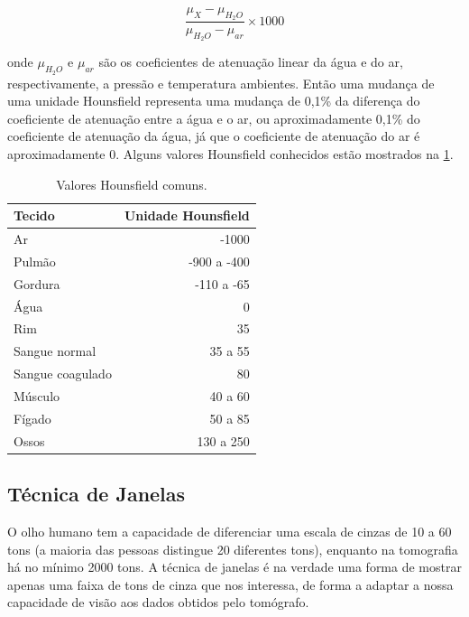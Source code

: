\begin{equation}
	\frac{\mu_X-\mu_{H_2O}}{\mu_{H_2O}-\mu_{ar}}\times 1000
	\label{equa:hounsfield}
\end{equation}

onde $\mu_{H_2O}$ e $\mu_{ar}$ são os coeficientes de atenuação linear da água e do ar, respectivamente, a pressão e temperatura ambientes. Então uma mudança de uma unidade Hounsfield representa uma mudança de 0,1\% da diferença do coeficiente de atenuação entre a água e o ar, ou aproximadamente 0,1\% do coeficiente de atenuação da água, já que o coeficiente de atenuação do ar é aproximadamente 0. Alguns valores Hounsfield conhecidos estão mostrados na \ref{tab:hounsfield}.

\begin{table}
 \label{tab:hounsfield}
 \caption{Valores Hounsfield comuns.}
 \cite{oliveira} %
 \begin{center}
 \begin{tabular}{|l|r|}
 \hline
 	\textbf{Tecido} & \textbf{Unidade Hounsfield} \\ \hline
 	Ar & -1000 \\ \hline
 	Pulmão & -900 a -400 \\ \hline
 	Gordura & -110 a -65 \\ \hline
 	Água & 0 \\ \hline
 	Rim & 35 \\ \hline
 	Sangue normal & 35 a 55 \\ \hline
 	Sangue coagulado & 80 \\ \hline
 	Músculo & 40 a 60 \\ \hline
 	Fígado & 50 a 85 \\ \hline
 	Ossos & 130 a 250 \\
 \hline
 \end{tabular}
 \end{center}
\end{table}

\subsection{Técnica de Janelas}

O olho humano tem a capacidade de diferenciar uma escala de cinzas de 10 a 60 tons (a maioria das pessoas distingue 20 diferentes tons), enquanto na tomografia há no mínimo 2000 tons. A técnica de janelas é na verdade uma forma de mostrar apenas uma faixa de tons de cinza que nos interessa, de forma a adaptar a nossa capacidade de visão aos dados obtidos pelo tomógrafo.

